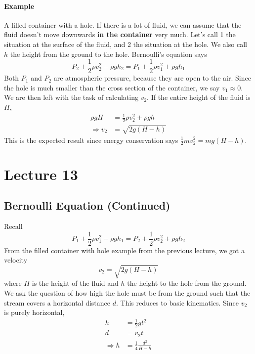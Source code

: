 \documentclass{report}
\numberwithin{equation}{section}
\begin{document}
\paragraph{Example} A filled container with a hole. If there is a lot of fluid, we can assume that the fluid doesn't move downwards
\textbf{in the container} very much. Let's call 1 the situation at the surface of the fluid, and 2 the situation at the hole. We also call
$h$ the height from the ground to the hole. Bernoulli's equation says
\begin{equation*}
    P_2 + \frac{1}{2}\rho v_2^2 + \rho gh_2 = P_1 + \frac{1}{2}\rho v_1^2 + \rho g h_1
\end{equation*}
Both $P_1$ and $P_2$ are atmospheric pressure, because they are open to the air. Since the hole is much smaller than the cross
section of the container, we say $v_1 \approx 0$. We are then left with the task of calculating $v_2$. If the entire height of the fluid is $H$,
\begin{align*}
    \rho g H &= \frac{1}{2}\rho v_2^2 + \rho g h \\
    \Rightarrow v_2 &= \sqrt{2g(H-h)}
\end{align*}
This is the expected result since energy conservation says $\frac{1}{2}mv_2^2 = mg(H-h)$.
\section{Lecture 13}
\subsection{Bernoulli Equation (Continued)}
Recall
\begin{equation*}
    P_1 + \frac{1}{2}\rho v_1^2 + \rho g h_1 = P_2 + \frac{1}{2}\rho v_2^2 + \rho g h_2
\end{equation*}
From the filled container with hole example from the previous lecture, we got a velocity
\begin{equation*}
    v_2 = \sqrt{2g(H-h)}
\end{equation*}
where $H$ is the height of the fluid and $h$ the height to the hole from the ground. We ask the question of how high the
hole must be from the ground such that the stream covers a horizontal distance $d$. This reduces to basic kinematics. Since $v_2$ is purely horizontal,
\begin{align*}
    h &= \frac{1}{2}gt^2\\
    d &= v_2 t\\
    \Rightarrow h &= \frac{1}{4}\frac{d^2}{H-h}
\end{align*}
\end{document}
